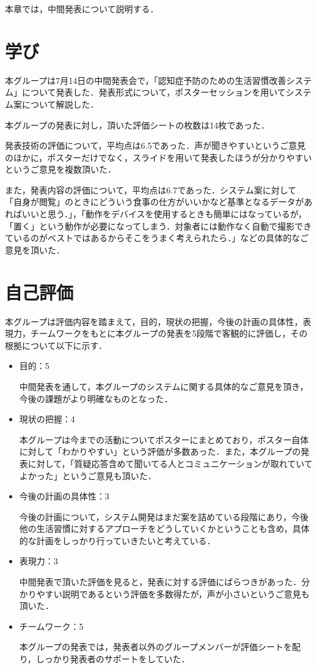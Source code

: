 \documentclass[../report]{subfiles}
\begin{document}
本章では，中間発表について説明する．

\section{学び}
本グループは7月14日の中間発表会で，「認知症予防のための生活習慣改善システム」について発表した．発表形式について，ポスターセッションを用いてシステム案について解説した．

本グループの発表に対し，頂いた評価シートの枚数は14枚であった．

発表技術の評価について，平均点は6.5であった．声が聞きやすいというご意見のほかに，ポスターだけでなく，スライドを用いて発表したほうが分かりやすいというご意見を複数頂いた．

また，発表内容の評価について，平均点は6.7であった．システム案に対して「自身が閲覧」のときにどういう食事の仕方がいいかなど基準となるデータがあればいいと思う．」，「動作をデバイスを使用するときも簡単にはなっているが，「置く」という動作が必要になってしまう．対象者には動作なく自動で撮影できているのがベストではあるからそこをうまく考えられたら．」などの具体的なご意見を頂いた．

\section{自己評価}
本グループは評価内容を踏まえて，目的，現状の把握，今後の計画の具体性，表現力，チームワークをもとに本グループの発表を5段階で客観的に評価し，その根拠について以下に示す．

\begin{itemize}
    \item 目的：5
    
中間発表を通して，本グループのシステムに関する具体的なご意見を頂き，今後の課題がより明確なものとなった．
    \item 現状の把握：4
   
 本グループは今までの活動についてポスターにまとめており，ポスター自体に対して「わかりやすい」という評価が多数あった．また，本グループの発表に対して，「質疑応答含めて聞いてる人とコミュニケーションが取れていてよかった」というご意見も頂いた．
    \item 今後の計画の具体性：3
  
  今後の計画について，システム開発はまだ案を詰めている段階にあり，今後他の生活習慣に対するアプローチをどうしていくかということも含め，具体的な計画をしっかり行っていきたいと考えている．
    \item 表現力：3

    中間発表で頂いた評価を見ると，発表に対する評価にばらつきがあった．分かりやすい説明であるという評価を多数得たが，声が小さいというご意見も頂いた．
    \item チームワーク：5

    本グループの発表では，発表者以外のグループメンバーが評価シートを配り，しっかり発表者のサポートをしていた．
\end{itemize}
\end{document}
